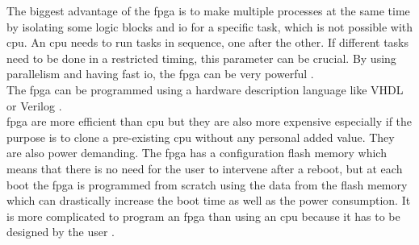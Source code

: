 The biggest advantage of the \gls{fpga} is to make multiple processes at the same time by isolating some logic blocks and \gls{io} for a specific task, which is not possible with \gls{cpu}. An \gls{cpu} needs to run tasks in sequence, one after the other. If different tasks need to be done in a restricted timing, this parameter can be crucial. 
By using parallelism and having fast \gls{io}, the \gls{fpga} can be very powerful \citep {FPGA_youtube} \citep{FPGA_center} \citep{FPGA_toronto}. \\

The \gls{fpga} can be programmed using a hardware description language like VHDL or Verilog \citep {FPGA_youtube} \citep{FPGA_center} \citep{FPGA_toronto}. \\

\gls{fpga} are more efficient than \gls{cpu} but they are also more expensive especially if the purpose is to clone a pre-existing \gls{cpu} without any personal added value. They are also power demanding. The \gls{fpga} has a configuration flash memory which means that there is no need for the user to intervene after a reboot, but at each boot the \gls{fpga} is programmed from scratch using the data from the flash memory which can drastically increase the boot time as well as the power consumption. It is more complicated to program an \gls{fpga} than using an \gls{cpu} because it has to be designed by the user \citep {FPGA_youtube} \citep{FPGA_center} \citep{FPGA_toronto}. \\








